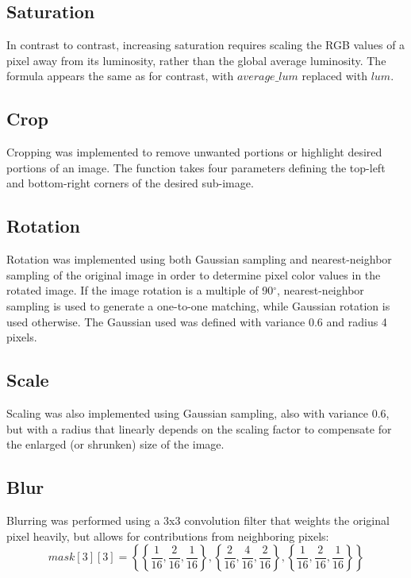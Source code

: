 \documentclass[10pt,twocolumn,twoside]{IEEEtran}
\begin{document}
\subsection{Saturation}
In contrast to contrast, increasing saturation requires scaling the RGB values of a pixel away from its luminosity, rather than the global average luminosity. The formula appears the same as for contrast, with $average\_lum$ replaced with $lum$.

\subsection{Crop}
Cropping was implemented to remove unwanted portions or highlight desired portions of an image. The function takes four parameters defining the top-left and bottom-right corners of the desired sub-image.

\subsection{Rotation}
Rotation was implemented using both Gaussian sampling and nearest-neighbor sampling of the original image in order to determine pixel color values in the rotated image. If the image rotation is a multiple of 90$^\circ$, nearest-neighbor sampling is used to generate a one-to-one matching, while Gaussian rotation is used otherwise. The Gaussian used was defined with variance 0.6 and radius 4 pixels. 

\subsection{Scale}
Scaling was also implemented using Gaussian sampling, also with variance 0.6, but with a radius that linearly depends on the scaling factor to compensate for the enlarged (or shrunken) size of the image.

\subsection{Blur}
Blurring was performed using a 3x3 convolution filter that weights the original pixel heavily, but allows for contributions from neighboring pixels:
\begin{equation*}
mask[3][3] = \left\{ \left\{\frac{1}{16}, \frac{2}{16}, \frac{1}{16}\right\}, \left\{\frac{2}{16}, \frac{4}{16}, \frac{2}{16}\right\}, \left\{\frac{1}{16}, \frac{2}{16}, \frac{1}{16}\right\} \right\}
\end{equation*}
\end{document}

